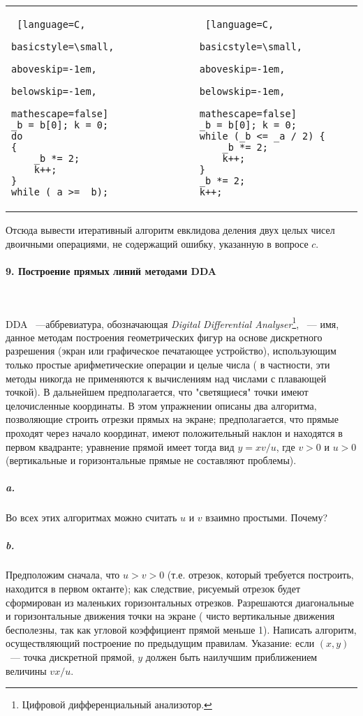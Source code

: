 \documentclass{mai_book}
\begin{document}
\begin{tabular}{p{6cm} p{6cm}}
\centering
\begin{lstlisting} [language=C,
					basicstyle=\small,
					aboveskip=-1em,
					belowskip=-1em,
					mathescape=false]			
_b = b[0]; k = 0;
do 
{
	_b *= 2;
	k++;
}
while (_a >= _b);
\end{lstlisting}&
\begin{lstlisting} [language=C,
					basicstyle=\small,
					aboveskip=-1em,
					belowskip=-1em,
					mathescape=false]
_b = b[0]; k = 0;
while (_b <= _a / 2) {
	_b *= 2;
	k++;
}
_b *= 2;
k++;
\end{lstlisting}
\end{tabular}

Отсюда вывести итеративный алгоритм евклидова деления двух целых чисел двоичными операциями, не содержащий ошибку, указанную в вопросе $c$. 

\paragraph { 9. Построение прямых линий методами DDA}\ \newline

DDA ~---аббревиатура, обозначающая \textit{Digital Differential Analyser}\footnote[1]{Цифровой дифференциальный анализотор.}, ~--- имя, данное методам построения геометрических фигур на основе дискретного разрешения (экран или графическое печатающее устройство), использующим только простые арифметические операции и целые числа ( в частности, эти методы никогда не применяются к вычислениям над числами с плавающей точкой). В дальнейшем предполагается, что "светящиеся" точки имеют целочисленные координаты. 
В этом упражнении описаны два алгоритма, позволяющие строить отрезки прямых на экране; предполагается, что прямые проходят через начало координат, имеют положительный наклон и находятся в первом квадранте; уравнение прямой имеет тогда вид $y=xv/u$, где $v>0$ и $u>0$ (вертикальные и горизонтальные прямые не составляют проблемы). 

\subparagraph { a.} Во всех этих алгоритмах можно считать $u$ и $v$ взаимно простыми. Почему?

\subparagraph { b.} Предположим сначала, что $u>v>0$ (т.е. отрезок, который требуется построить, находится в первом октанте); как следствие, рисуемый отрезок будет сформирован из маленьких горизонтальных отрезков. Разрешаются диагональные и горизонтальные движения точки на экране ( чисто вертикальные движения бесполезны, так как угловой коэффициент прямой меньше 1). Написать алгоритм, осуществляющий построение по предыдущим правилам. Указание: если $\left({x,y}\right)$ ~--- точка дискретной прямой, $y$ должен быть наилучшим приближением величины $vx/u$. 
\end{document}
